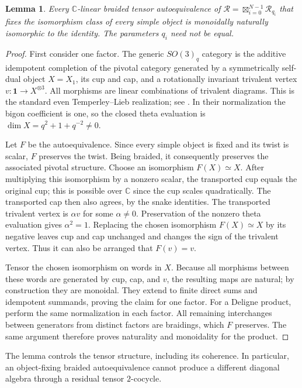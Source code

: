\documentclass[11pt,a4paper]{article}
\numberwithin{equation}{section}
\newtheorem{lemma}[theorem]{Lemma}
\theoremstyle{definition}\newtheorem{definition}[theorem]{Definition}
\theoremstyle{remark}\newtheorem{remark}[theorem]{Remark}
\begin{document}
\begin{lemma}\label{c:object-fixing-trivial}
Every $\mathbb C$-linear braided tensor autoequivalence of
$\mathcal R=\boxtimes_{i=0}^{N-1}\mathcal R_{q_i}$ that fixes the isomorphism
class of every simple object is monoidally naturally isomorphic to the
identity.  The parameters $q_i$ need not be equal.
\end{lemma}
\begin{proof}
First consider one factor.  The generic $SO(3)_q$ category is the additive
idempotent completion of the pivotal category generated by a symmetrically
self-dual object $X=X_1$, its cup and cap, and a rotationally invariant
trivalent vertex $v:\mathbf1\longrightarrow X^{\otimes3}$.
All morphisms are linear combinations of trivalent diagrams.  This is the
standard even Temperley--Lieb realization; see \cite[Proposition 4.3]{c:MPS}.  In their normalization the bigon coefficient is one, so the closed
theta evaluation is $\dim X=q^2+1+q^{-2}\ne0$.

Let $F$ be the autoequivalence.  Since every simple object is fixed and its
twist is scalar, $F$ preserves the twist.  Being braided, it consequently
preserves the associated pivotal structure.  Choose an isomorphism
$F(X)\simeq X$.  After multiplying this isomorphism by a nonzero scalar,
the transported cup equals the original cup; this is possible over
$\mathbb C$ since the cup scales quadratically.  The transported cap then
also agrees, by the snake identities.  The transported trivalent vertex is
$\alpha v$ for some $\alpha\ne0$.  Preservation of the nonzero theta
evaluation gives $\alpha^2=1$.  Replacing the chosen isomorphism
$F(X)\simeq X$ by its negative leaves cup and cap unchanged and changes the
sign of the trivalent vertex.  Thus it can also be arranged that $F(v)=v$.

Tensor the chosen isomorphism on words in $X$.  Because all morphisms between
these words are generated by cup, cap, and $v$, the resulting maps are natural;
by construction they are monoidal.  They extend to finite direct sums and
idempotent summands, proving the claim for one factor.  For a Deligne product,
perform the same normalization in each factor.  All remaining interchanges
between generators from distinct factors are braidings, which $F$ preserves.
The same argument therefore proves naturality and monoidality for the product.
\end{proof}

The lemma controls the tensor structure, including its coherence.
In particular, an object-fixing braided autoequivalence cannot produce
a different diagonal algebra through a residual tensor $2$-cocycle.
\end{document}
